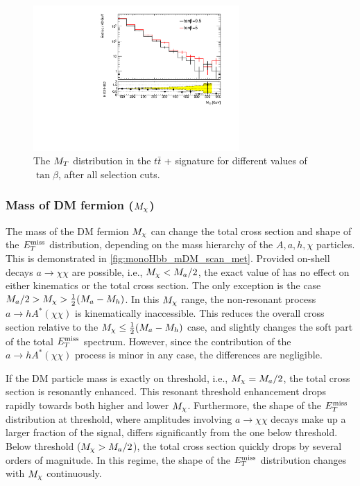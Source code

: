 \begin{figure}[tbp]
\centering
\includegraphics[width = 0.7\textwidth]{texinputs/04_grid/figures/DMHF/mt2plot_comparisonTanBeta.pdf}
  \caption{The $M_{T}$ distribution in the $t\bar{t}$ + \MET signature for different values of $\tan\beta$, after all selection cuts.\label{fig:kin_tanB_afterCuts}}
\end{figure}

\subsubsection{Mass of DM fermion ($M_{\chi}$)}
\label{subsub:mDMKinematics}

The mass of the DM fermion $M_{\chi}$ can change the total cross section and shape of the $E_T^\mathrm{miss}$ distribution, depending on the mass hierarchy of the $A,a,h,\chi$ particles. This is demonstrated in \autoref{fig:monoHbb_mDM_scan_met}. 
Provided on-shell  decays $a\to\chi\chi$ are possible, i.e., $M_{\chi} < M_{a}/2$, the exact value of \mDM has no effect on either kinematics or the total cross section. 
The only exception is the case $M_{a}/2 > M_{\chi} > \frac{1}{2}(M_{a} - M_h)$. In this  $M_{\chi}$ range, the non-resonant process $a \to h A^*\left(\chi\chi\right) $ is kinematically inaccessible. 
This reduces the overall cross section relative to the $M_{\chi} \leq \frac{1}{2}(M_{a} - M_h)$ case, and slightly changes the soft part of the total $E_T^\mathrm{miss}$ spectrum. 
However, since the contribution of the $a \to h A^*\left(\chi \chi\right)$ process is minor in any case, the differences are negligible.

If the DM particle mass is exactly on threshold, i.e., $M_{\chi} = M_{a}/2$, the total cross section is resonantly enhanced. 
This resonant threshold enhancement drops rapidly towards both higher and lower $M_{\chi}$. Furthermore, the shape of the $E_T^\mathrm{miss}$ distribution at threshold, where amplitudes involving $a\to\chi\chi$ decays make up a larger fraction of the signal, differs significantly from the one below threshold. 
Below threshold ($M_{\chi} > M_{a}/2$), the total cross section quickly drops by several orders of magnitude. In this regime, the shape of the $E_T^\mathrm{miss}$ distribution changes with $M_{\chi}$ continuously.

